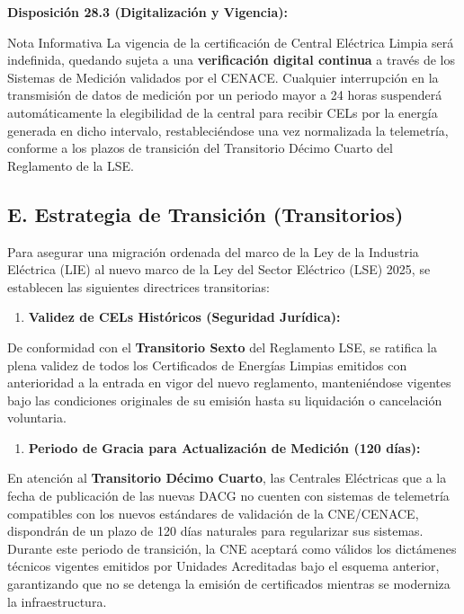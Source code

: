 \documentclass{cel}
\begin{document}
\textbf{Disposición 28.3 (Digitalización y Vigencia):}


\vspace{0.2cm}
\begin{glowBox}[gobmxDorado]{Nota Informativa}
\textquotedbl{}La vigencia de la certificación de Central Eléctrica Limpia será indefinida, quedando sujeta a una \textbf{verificación digital continua} a través de los Sistemas de Medición validados por el CENACE. Cualquier interrupción en la transmisión de datos de medición por un periodo mayor a 24 horas suspenderá automáticamente la elegibilidad de la central para recibir CELs por la energía generada en dicho intervalo, restableciéndose una vez normalizada la telemetría, conforme a los plazos de transición del Transitorio Décimo Cuarto del Reglamento de la LSE.\textquotedbl{}
\end{glowBox}

\subsection{E. Estrategia de Transición (Transitorios)}
\nopagebreak

Para asegurar una migración ordenada del marco de la Ley de la Industria Eléctrica (LIE) al nuevo marco de la Ley del Sector Eléctrico (LSE) 2025, se establecen las siguientes directrices transitorias:


\begin{enumerate}
\item \textbf{Validez de CELs Históricos (Seguridad Jurídica):}
\end{enumerate}
De conformidad con el \textbf{Transitorio Sexto} del Reglamento LSE, se ratifica la plena validez de todos los Certificados de Energías Limpias emitidos con anterioridad a la entrada en vigor del nuevo reglamento, manteniéndose vigentes bajo las condiciones originales de su emisión hasta su liquidación o cancelación voluntaria.

\begin{enumerate}
\item \textbf{Periodo de Gracia para Actualización de Medición (120 días):}
\end{enumerate}
En atención al \textbf{Transitorio Décimo Cuarto}, las Centrales Eléctricas que a la fecha de publicación de las nuevas DACG no cuenten con sistemas de telemetría compatibles con los nuevos estándares de validación de la CNE/CENACE, dispondrán de un plazo de 120 días naturales para regularizar sus sistemas. Durante este periodo de transición, la CNE aceptará como válidos los dictámenes técnicos vigentes emitidos por Unidades Acreditadas bajo el esquema anterior, garantizando que no se detenga la emisión de certificados mientras se moderniza la infraestructura.
\end{document}
